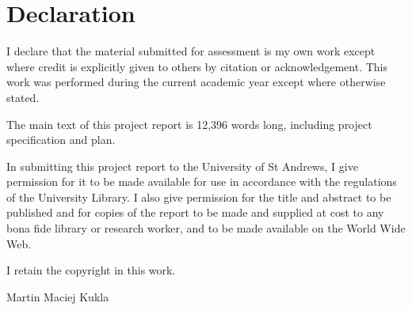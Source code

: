 \section*{Declaration}

\noindent I declare that the material submitted for assessment is my own work except where credit is explicitly given to others by citation or acknowledgement. This work was performed during the current academic year except where otherwise stated. 

\vspace{20pt}

\noindent The main text of this project report is 12,396 words long, including project specification and plan. 


\vspace{20pt}

\noindent In submitting this project report to the University of St Andrews, I give permission for it to be made available for use in accordance with the regulations of the University Library. I also give permission for the title and abstract to be published and for copies of the report to be made and supplied at cost to any bona fide library or research worker, and to be made available on the World Wide Web. 


\vspace{20pt}

\noindent I retain the copyright in this work. 


\vspace{20pt}

\noindent Martin Maciej Kukla
